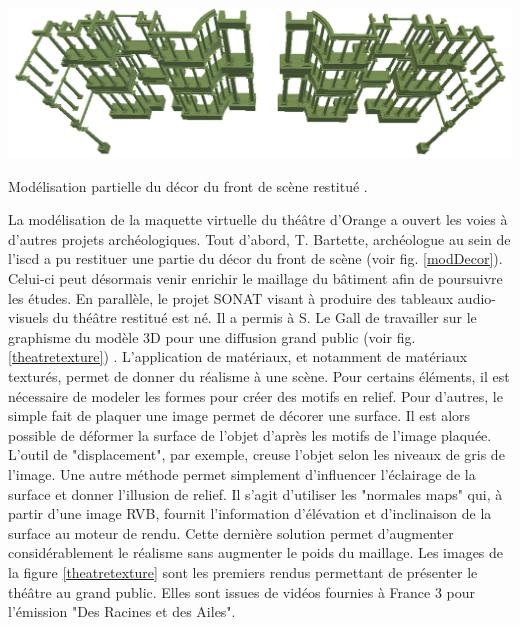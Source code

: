  \begin{figureth}
		\includegraphics[width=\linewidth]{images/modDecor}
	\caption[Modélisation partielle du décor du front de scène restitué.]{Modélisation partielle du décor du front de scène restitué \footnotemark.} 
	\label{modDecor}
\end{figureth}
La modélisation de la maquette virtuelle du théâtre d'Orange a ouvert les voies à d'autres projets archéologiques. Tout d'abord, T. Bartette, archéologue au sein de l'\gls{iscd} a pu restituer une partie du décor du front de scène (voir fig. \ref{modDecor}). Celui-ci peut désormais venir enrichir le maillage du bâtiment afin de poursuivre les études. En parallèle, le projet SONAT visant à produire des tableaux audio-visuels du théâtre restitué est né. Il a permis à S. Le Gall de travailler sur le graphisme du modèle 3D pour une diffusion grand public (voir fig. \ref{theatretexture}) \cite[S. LeGall]{titien}. L'application de matériaux, et notamment de matériaux texturés, permet de donner du réalisme à une scène. Pour certains éléments, il est nécessaire de modeler les formes pour créer des motifs en relief. Pour d'autres, le simple fait de plaquer une image permet de décorer une surface. Il est alors possible de déformer la surface de l'objet d'après les motifs de l'image plaquée. L'outil de "displacement", par exemple, creuse l'objet selon les niveaux de gris de l'image. Une autre méthode permet simplement d'influencer l'éclairage de la surface et donner l'illusion de relief. Il s'agit d'utiliser les "normales maps" qui, à partir d'une image \gls{RVB}, fournit l'information d'élévation et d'inclinaison de la surface au moteur de rendu. Cette dernière solution permet d'augmenter considérablement le réalisme sans augmenter le poids du maillage. Les images de la figure \ref{theatretexture} sont les premiers rendus permettant de présenter le théâtre au grand public. Elles sont issues de vidéos fournies à France 3 pour l'émission "Des Racines et des Ailes".

